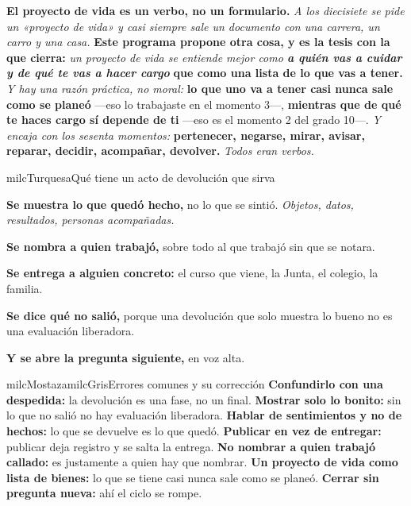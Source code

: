 \documentclass[11pt,letterpaper]{article}
\newcommand{\milcpaso}[3]{%
\Needspace{4\baselineskip}%
\begin{tcolorbox}[enhanced,colback=white,colframe=milcLinea,arc=1.5mm,boxrule=.9pt,
  left=14mm,right=4mm,top=3mm,bottom=3mm,before skip=4pt,after skip=4pt,
  fontupper=\RaggedRight,
  overlay={\node[anchor=north west,circle,fill=#2,text=white,inner sep=0pt,
    minimum size=7.4mm,font=\sffamily\bfseries\small]
    at ([xshift=3.6mm,yshift=-3.2mm]frame.north west) {#1};}]
#3
\end{tcolorbox}}
\begin{document}
\milcpaso{4}{milcTurquesa}{\textbf{El proyecto de vida es un verbo, no un formulario.} \emph{A los diecisiete se pide un «proyecto de vida» y casi siempre sale un documento con una carrera, un carro y una casa.} \textbf{Este programa propone otra cosa, y es la tesis con la que cierra:} \emph{un proyecto de vida se entiende mejor como \textbf{a quién vas a cuidar y de qué te vas a hacer cargo}} \textbf{que como una lista de lo que vas a tener.} \emph{Y hay una razón práctica, no moral:} \textbf{lo que uno va a tener casi nunca sale como se planeó} ---eso lo trabajaste en el momento 3---, \textbf{mientras que de qué te haces cargo sí depende de ti} ---eso es el momento 2 del grado 10---. \emph{Y encaja con los sesenta momentos:} \textbf{pertenecer, negarse, mirar, avisar, reparar, decidir, acompañar, devolver.} \emph{Todos eran verbos.}}

\begin{drawbox}{milcTurquesa}{Qué tiene un acto de devolución que sirva}
\begin{pasoslista}
\item \textbf{Se muestra lo que quedó hecho,} no lo que se sintió. \emph{Objetos, datos, resultados, personas acompañadas.}
\item \textbf{Se nombra a quien trabajó,} sobre todo al que trabajó sin que se notara.
\item \textbf{Se entrega a alguien concreto:} el curso que viene, la Junta, el colegio, la familia.
\item \textbf{Se dice qué no salió,} porque una devolución que solo muestra lo bueno no es una evaluación liberadora.
\item \textbf{Y se abre la pregunta siguiente,} en voz alta.
\end{pasoslista}
\end{drawbox}

\begin{softbox}{milcMostaza}{milcGris}{Errores comunes y su corrección}
\textbf{Confundirlo con una despedida:} la devolución es una fase, no un final. \textbf{Mostrar solo lo bonito:} sin lo que no salió no hay evaluación liberadora. \textbf{Hablar de sentimientos y no de hechos:} lo que se devuelve es lo que quedó. \textbf{Publicar en vez de entregar:} publicar deja registro y se salta la entrega. \textbf{No nombrar a quien trabajó callado:} es justamente a quien hay que nombrar. \textbf{Un proyecto de vida como lista de bienes:} lo que se tiene casi nunca sale como se planeó. \textbf{Cerrar sin pregunta nueva:} ahí el ciclo se rompe.
\end{softbox}
\end{document}
